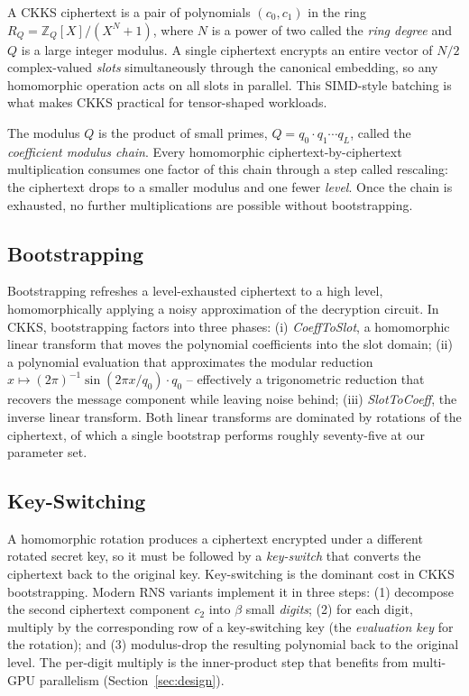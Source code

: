 \documentclass[conference]{IEEEtran}
\begin{document}
A CKKS ciphertext is a pair of polynomials $(c_0, c_1)$ in the ring
$R_Q = \mathbb{Z}_Q[X] / (X^N + 1)$, where $N$ is a power of two called
the \emph{ring degree} and $Q$ is a large integer modulus. A single
ciphertext encrypts an entire vector of $N/2$ complex-valued
\emph{slots} simultaneously through the canonical embedding, so any
homomorphic operation acts on all slots in parallel. This SIMD-style
batching is what makes CKKS practical for tensor-shaped workloads.

The modulus $Q$ is the product of small primes,
$Q = q_0 \cdot q_1 \cdots q_L$, called the \emph{coefficient modulus
chain}. Every homomorphic ciphertext-by-ciphertext multiplication
consumes one factor of this chain through a step called rescaling: the
ciphertext drops to a smaller modulus and one fewer \emph{level}.
Once the chain is exhausted, no further multiplications are possible
without bootstrapping.

\subsection{Bootstrapping}

Bootstrapping refreshes a level-exhausted ciphertext to a high level,
homomorphically applying a noisy approximation of the decryption
circuit. In CKKS, bootstrapping factors into three phases:
(i) \emph{CoeffToSlot}, a homomorphic linear transform that moves the
polynomial coefficients into the slot domain;
(ii) a polynomial evaluation that approximates the modular reduction
$x \mapsto (2\pi)^{-1} \sin(2\pi x / q_0) \cdot q_0$ -- effectively a
trigonometric reduction that recovers the message component while
leaving noise behind;
(iii) \emph{SlotToCoeff}, the inverse linear transform.
Both linear transforms are dominated by rotations of the ciphertext, of
which a single bootstrap performs roughly seventy-five at our parameter
set.

\subsection{Key-Switching}

A homomorphic rotation produces a ciphertext encrypted under a
different rotated secret key, so it must be followed by a
\emph{key-switch} that converts the ciphertext back to the original
key. Key-switching is the dominant cost in CKKS bootstrapping. Modern
RNS variants implement it in three steps: (1) decompose the second
ciphertext component $c_2$ into $\beta$ small \emph{digits};
(2) for each digit, multiply by the corresponding row of a
key-switching key (the \emph{evaluation key} for the rotation); and
(3) modulus-drop the resulting polynomial back to the original level.
The per-digit multiply is the inner-product step that benefits from
multi-GPU parallelism (Section~\ref{sec:design}).
\end{document}
